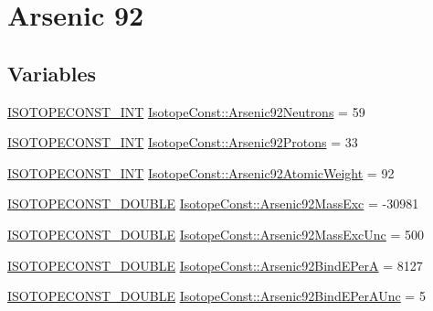 \hypertarget{group___isotope_const-_arsenic-_as92}{}\section{Arsenic 92}
\label{group___isotope_const-_arsenic-_as92}
\subsection*{Variables}
\begin{DoxyCompactItemize}
\item 
\mbox{\hyperlink{group___isotope_const-_macros_ga5f18360b3e99483a35c32d789e62621c}{I\+S\+O\+T\+O\+P\+E\+C\+O\+N\+S\+T\+\_\+\+I\+NT}} \mbox{\hyperlink{group___isotope_const-_arsenic-_as92_ga5a12e84ee6cdcfe077889c1896a99f71}{Isotope\+Const\+::\+Arsenic92\+Neutrons}} = 59
\item 
\mbox{\hyperlink{group___isotope_const-_macros_ga5f18360b3e99483a35c32d789e62621c}{I\+S\+O\+T\+O\+P\+E\+C\+O\+N\+S\+T\+\_\+\+I\+NT}} \mbox{\hyperlink{group___isotope_const-_arsenic-_as92_ga69422de8c001da5c270cfce91c6b791a}{Isotope\+Const\+::\+Arsenic92\+Protons}} = 33
\item 
\mbox{\hyperlink{group___isotope_const-_macros_ga5f18360b3e99483a35c32d789e62621c}{I\+S\+O\+T\+O\+P\+E\+C\+O\+N\+S\+T\+\_\+\+I\+NT}} \mbox{\hyperlink{group___isotope_const-_arsenic-_as92_ga0fc6a157eedce8cf64fca025f299d573}{Isotope\+Const\+::\+Arsenic92\+Atomic\+Weight}} = 92
\item 
\mbox{\hyperlink{group___isotope_const-_macros_ga8f45a7272ce02c0b4c65c44636ed719a}{I\+S\+O\+T\+O\+P\+E\+C\+O\+N\+S\+T\+\_\+\+D\+O\+U\+B\+LE}} \mbox{\hyperlink{group___isotope_const-_arsenic-_as92_gac07b9a8d23aae132c41f522a08102ccb}{Isotope\+Const\+::\+Arsenic92\+Mass\+Exc}} = -\/30981
\item 
\mbox{\hyperlink{group___isotope_const-_macros_ga8f45a7272ce02c0b4c65c44636ed719a}{I\+S\+O\+T\+O\+P\+E\+C\+O\+N\+S\+T\+\_\+\+D\+O\+U\+B\+LE}} \mbox{\hyperlink{group___isotope_const-_arsenic-_as92_ga0636c16483e42057407e0f5b391d108b}{Isotope\+Const\+::\+Arsenic92\+Mass\+Exc\+Unc}} = 500
\item 
\mbox{\hyperlink{group___isotope_const-_macros_ga8f45a7272ce02c0b4c65c44636ed719a}{I\+S\+O\+T\+O\+P\+E\+C\+O\+N\+S\+T\+\_\+\+D\+O\+U\+B\+LE}} \mbox{\hyperlink{group___isotope_const-_arsenic-_as92_ga6edb70750dfe9bfe9ebdaa4091c5c8ab}{Isotope\+Const\+::\+Arsenic92\+Bind\+E\+PerA}} = 8127
\item 
\mbox{\hyperlink{group___isotope_const-_macros_ga8f45a7272ce02c0b4c65c44636ed719a}{I\+S\+O\+T\+O\+P\+E\+C\+O\+N\+S\+T\+\_\+\+D\+O\+U\+B\+LE}} \mbox{\hyperlink{group___isotope_const-_arsenic-_as92_gad364e2b9bb402a706254178aa003f496}{Isotope\+Const\+::\+Arsenic92\+Bind\+E\+Per\+A\+Unc}} = 5

\end{DoxyCompactItemize}
